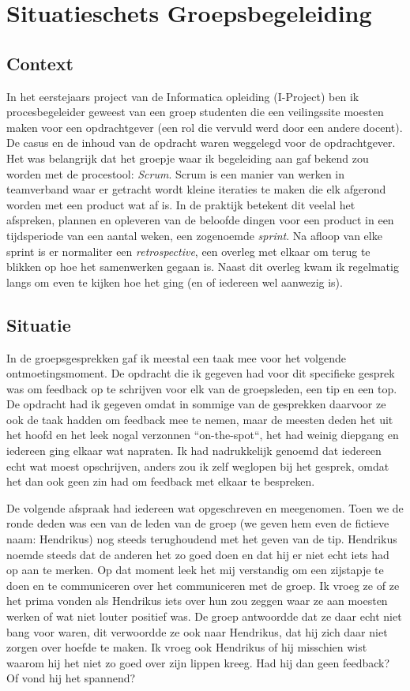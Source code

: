 
\section{Situatieschets Groepsbegeleiding}
\label{sec:groep}
\subsection{Context}
In het eerstejaars project van de Informatica opleiding (I-Project) ben ik procesbegeleider geweest van een groep studenten die een veilingssite moesten maken voor een opdrachtgever (een rol die vervuld werd door een andere docent). De casus en de inhoud van de opdracht waren weggelegd voor de opdrachtgever. Het was belangrijk dat het groepje waar ik begeleiding aan gaf bekend zou worden met de procestool: \textit{Scrum}. Scrum is een manier van werken in teamverband waar er getracht wordt kleine iteraties te maken die elk afgerond worden met een product wat af is. In de praktijk betekent dit veelal het afspreken, plannen en opleveren van de beloofde dingen voor een product in een tijdsperiode van een aantal weken, een zogenoemde \textit{sprint}. Na afloop van elke sprint is er normaliter een \textit{retrospective}, een overleg met elkaar om terug te blikken op hoe het samenwerken gegaan is. Naast dit overleg kwam ik regelmatig langs om even te kijken hoe het ging (en of iedereen wel aanwezig is).

\subsection{Situatie}
In de groepsgesprekken gaf ik meestal een taak mee voor het volgende ontmoetingsmoment. De opdracht die ik gegeven had voor dit specifieke gesprek was om feedback op te schrijven voor elk van de groepsleden, een tip en een top. De opdracht had ik gegeven omdat in sommige van de gesprekken daarvoor ze ook de taak hadden om feedback mee te nemen, maar de meesten deden het uit het hoofd en het leek nogal verzonnen ``on-the-spot``, het had weinig diepgang en iedereen ging elkaar wat napraten. Ik had nadrukkelijk genoemd dat iedereen echt wat moest opschrijven, anders zou ik zelf weglopen bij het gesprek, omdat het dan ook geen zin had om feedback met elkaar te bespreken.

De volgende afspraak had iedereen wat opgeschreven en meegenomen. Toen we de ronde deden was een van de leden van de groep (we geven hem even de fictieve naam: Hendrikus) nog steeds terughoudend met het geven van de tip. Hendrikus noemde steeds dat de anderen het zo goed doen en dat hij er niet echt iets had op aan te merken. Op dat moment leek het mij verstandig om een zijstapje te doen en te communiceren over het communiceren met de groep. Ik vroeg ze of ze het prima vonden als Hendrikus iets over hun zou zeggen waar ze aan moesten werken of wat niet louter positief was. De groep antwoordde dat ze daar echt niet bang voor waren, dit verwoordde ze ook naar Hendrikus, dat hij zich daar niet zorgen over hoefde te maken. Ik vroeg ook Hendrikus of hij misschien wist waarom hij het niet zo goed over zijn lippen kreeg. Had hij dan geen feedback? Of vond hij het spannend? 

